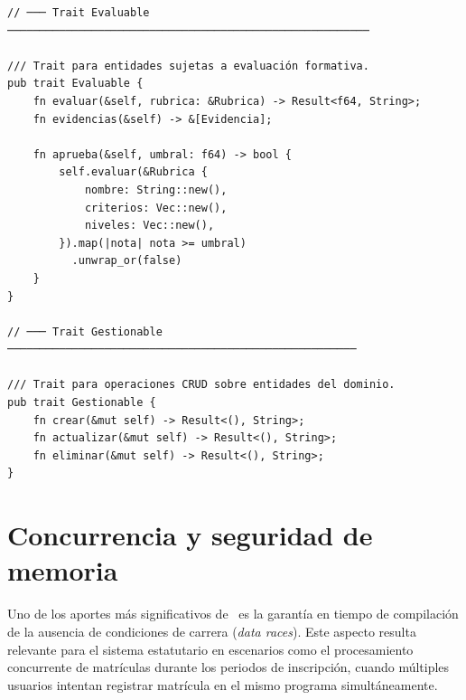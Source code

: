 \begin{lstlisting}[style=rustStyle, caption={Sistema de evaluación en \rust}, label={lst:rust-evaluacion}]
// ─── Trait Evaluable ────────────────────────────────────────────────────────

/// Trait para entidades sujetas a evaluación formativa.
pub trait Evaluable {
    fn evaluar(&self, rubrica: &Rubrica) -> Result<f64, String>;
    fn evidencias(&self) -> &[Evidencia];

    fn aprueba(&self, umbral: f64) -> bool {
        self.evaluar(&Rubrica {
            nombre: String::new(),
            criterios: Vec::new(),
            niveles: Vec::new(),
        }).map(|nota| nota >= umbral)
          .unwrap_or(false)
    }
}

// ─── Trait Gestionable ──────────────────────────────────────────────────────

/// Trait para operaciones CRUD sobre entidades del dominio.
pub trait Gestionable {
    fn crear(&mut self) -> Result<(), String>;
    fn actualizar(&mut self) -> Result<(), String>;
    fn eliminar(&mut self) -> Result<(), String>;
}
\end{lstlisting}

\section{Concurrencia y seguridad de memoria}
\label{sec:rust-concurrencia}

\noindent
Uno de los aportes más significativos de \rust\ es la garantía en tiempo de compilación
de la ausencia de condiciones de carrera (\textit{data races}). Este aspecto resulta
relevante para el sistema estatutario en escenarios como el procesamiento concurrente
de matrículas durante los periodos de inscripción, cuando múltiples usuarios intentan
registrar matrícula en el mismo programa simultáneamente.

